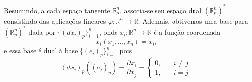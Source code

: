 \documentclass[../differential_forms.tex]{subfiles}
\begin{document}
Resumindo, a cada espaço tangente \(\mathbb{R}_{p}^{n}\), associa-se seu espaço dual \((\mathbb{R}_{p}^{n})^{*}\) consistindo das aplicações lineares \(\varphi :\mathbb{R}^{n}\rightarrow \mathbb{R}\). Ademais,
obtivemos uma base para \((\mathbb{R}_{p}^{n})^{*}\) dada por \(\{(dx_{i})_{p}\}_{i=1}^{n}\), onde \(x_{i}:\mathbb{R}^{n}\rightarrow \mathbb{R}\) é a função coordenada
\[
	x_{i}(x_1,\dotsc ,x_{n})=x_{i},
\]
e essa base é dual à base \(\{(e_{i})_{p}\}_{i=1}^{n}\) pois
\[
	(dx_{i})_{p}((e_{j})_{p})=\frac{\partial^{}x_{i}}{\partial x_{j}^{}}  = \left\{\begin{array}{ll}
		0, & \quad i\neq j \\
		1, & \quad i=j
	\end{array}\right..
\]
\end{document}
